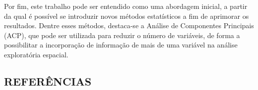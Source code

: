 Por fim, este trabalho pode ser entendido como uma abordagem inicial, a partir da qual é possível se introduzir novos métodos estatísticos a fim de aprimorar os resultados. Dentre esses métodos, destaca-se a Análise de Componentes Principais (ACP), que pode ser utilizada para reduzir o número de variáveis,  de forma a possibilitar a incorporação de informação de mais de uma variável na análise exploratória espacial.

\newpage
{}
\begin{center}
\section*{REFERÊNCIAS} 
\end{center}


